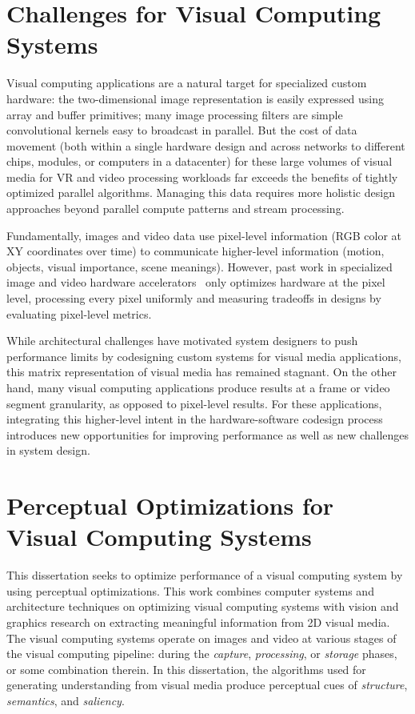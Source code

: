 \section{Challenges for Visual Computing Systems}
Visual computing applications are a natural target for specialized custom hardware: the two-dimensional image representation is easily expressed using array and buffer primitives; many image processing filters are simple convolutional kernels easy to broadcast in parallel.
But the cost of data movement (both within a single hardware design and across networks to different chips, modules, or computers in a datacenter) for these large volumes of visual media for VR and video processing workloads far exceeds the benefits of tightly optimized parallel algorithms.
Managing this data requires more holistic design approaches beyond parallel compute patterns and stream processing.

Fundamentally, images and video data use pixel-level information (RGB color at XY coordinates over time) to communicate higher-level information (motion, objects, visual importance, scene meanings).
However, past work in specialized image and video hardware accelerators~\cite{hauswald2014hybrid, convolution_engine, adams2010frankencamera} only optimizes hardware at the pixel level, processing every pixel uniformly and measuring tradeoffs in designs by evaluating pixel-level metrics.

While architectural challenges have motivated system designers to push performance limits by codesigning custom systems for visual media applications, this matrix representation of visual media has remained stagnant.
On the other hand, many visual computing applications produce results at a frame or video segment granularity, as opposed to pixel-level results.
For these applications, integrating this higher-level intent in the hardware-software codesign process introduces new opportunities for improving performance as well as new challenges in system design.

\section{Perceptual Optimizations for Visual Computing Systems}
This dissertation seeks to optimize performance of a visual computing system by using perceptual optimizations.
This work combines computer systems and architecture techniques on optimizing visual computing systems with vision and graphics research on extracting meaningful information from 2D visual media.
The visual computing systems operate on images and video at various stages of the visual computing pipeline: during the \emph{capture}, \emph{processing}, or \emph{storage} phases, or some combination therein.
In this dissertation, the algorithms used for generating understanding from visual media produce perceptual cues of \emph{structure}, \emph{semantics}, and \emph{saliency}.

